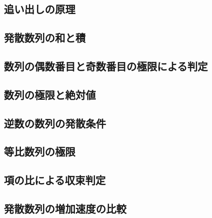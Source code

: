\documentclass[../../math-imaging]{subfiles}
\begin{document}
\subsection{追い出しの原理}


\subsection{発散数列の和と積}


\subsection{数列の偶数番目と奇数番目の極限による判定}


\subsection{数列の極限と絶対値}


\subsection{逆数の数列の発散条件}


\subsection{等比数列の極限}


\subsection{項の比による収束判定}


\subsection{発散数列の増加速度の比較}

\end{document}
